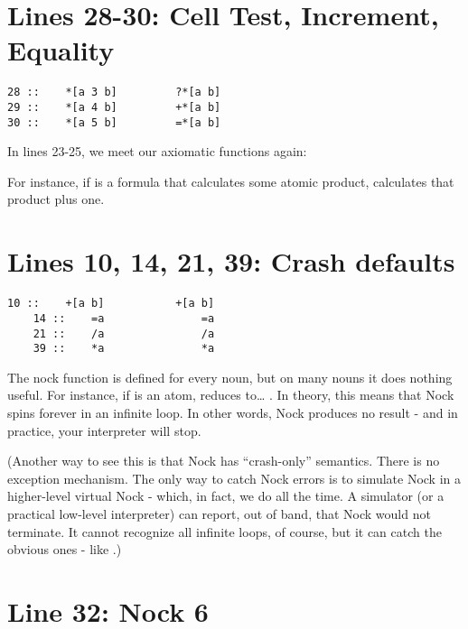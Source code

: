 \section{Lines 28-30: Cell Test, Increment, Equality}

\begin{framed_shaded}
\begin{Verbatim}[fontsize=\relsize{-2.5},commandchars=\\\{\}]
28 ::    *[a 3 b]         ?*[a b]
29 ::    *[a 4 b]         +*[a b]
30 ::    *[a 5 b]         =*[a b]
\end{Verbatim}
\end{framed_shaded}
In lines 23-25, we meet our axiomatic functions again:

For instance, if  is a formula that calculates some atomic product, \kode{[4 x]}
calculates that product plus one. 

\section{Lines 10, 14, 21, 39: Crash defaults}

\begin{framed_shaded}
\begin{Verbatim}[fontsize=\relsize{-2.5},commandchars=\\\{\}]
    10 ::    +[a b]           +[a b]
    14 ::    =a               =a
    21 ::    /a               /a
    39 ::    *a               *a
\end{Verbatim}
\end{framed_shaded}

The nock function is defined for every noun, but on many nouns it does nothing
useful.  For instance, if  is an atom,  reduces to\ldots{} .  In theory,
this means that Nock spins forever in an infinite loop.  In other words, Nock
produces no result - and in practice, your interpreter will stop.

(Another way to see this is that Nock has ``crash-only'' semantics.  There is no
exception mechanism.  The only way to catch Nock errors is to simulate Nock in
a higher-level virtual Nock - which, in fact, we do all the time.  A simulator
(or a practical low-level interpreter) can report, out of band, that Nock would
not terminate.  It cannot recognize all infinite loops, of course, but it can
catch the obvious ones - like .)

\section{Line 32: Nock 6}

